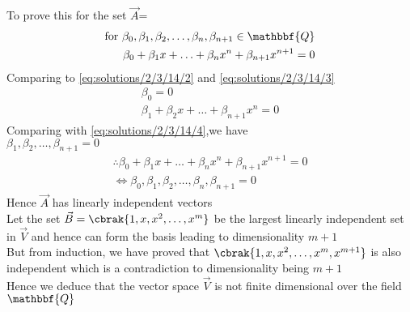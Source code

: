 To prove this for the set $\vec{A}$=
\begin{align}
\text{for  }\beta_0,\beta_1,\beta_2,\hdots,\beta_n,\beta_{n+1} \in \mathbbf{Q}\\  
  \beta_0+\beta_1x+\hdots+\beta_nx^n+\beta_{n+1}x^{n+1}=0 
\end{align}
Comparing to \eqref{eq:solutions/2/3/14/2} and \eqref{eq:solutions/2/3/14/3}
\begin{align}
    \beta_0=0\\
    \beta_1+\beta_2x+\hdots+\beta_{n+1}x^n=0
\end{align}
Comparing with \eqref{eq:solutions/2/3/14/4},we have\\
$\beta_1,\beta_2,\hdots,\beta_{n+1}=0$
\begin{align}
    \therefore  \beta_0+\beta_1x+\hdots+\beta_nx^n+\beta_{n+1}x^{n+1}=0 
\\ \iff
    \beta_0,\beta_1,\beta_2,\hdots,\beta_n,\beta_{n+1}=0
\end{align}
Hence $\vec{A}$ has linearly independent vectors\\
Let the set $\vec{B} =\cbrak{1,x,x^2,\hdots,x^m}$ be the largest linearly independent set in $\vec{V}$ and hence can form the basis leading to dimensionality $m+1$\\
But from induction, we have proved that $\cbrak{1,x,x^2,\hdots,x^m,x^{m+1}}$ is also independent which is a contradiction to dimensionality being $m+1$\\
Hence we deduce that the vector space $\vec{V}$ is not finite dimensional over the field $\mathbbf{Q}$

